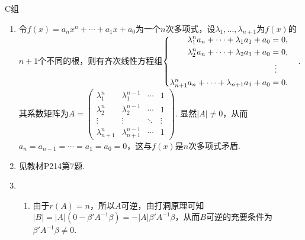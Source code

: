 \centerline{\heiti C组}
\begin{enumerate}
    \item 令$f(x)=a_nx^n+\cdots+a_1x+a_0$为一个$n$次多项式，设$\lambda_1,\ldots,\lambda_{n+1}$为$f(x)$的$n+1$个不同的根，则有齐次线性方程组$\begin{cases} \begin{aligned}
                      \lambda_1^n a_n+\cdots+\lambda_1a_1+a_0         & =0,               \\
                      \lambda_2^n a_n+\cdots+\lambda_2a_1+a_0         & =0,               \\
                                                                      & \vdotswithin{ = } \\
                      \lambda_{n+1}^n a_n+\cdots+\lambda_{n+1}a_1+a_0 & =0.
                  \end{aligned} \end{cases}$. 其系数矩阵为$A=\begin{pmatrix}
                  \lambda_1^n     & \lambda_1^{n-1}     & \cdots & 1      \\
                  \lambda_2^n     & \lambda_2^{n-1}     & \cdots & 1      \\
                  \vdots          & \vdots              & \ddots & \vdots \\
                  \lambda_{n+1}^n & \lambda_{n+1}^{n-1} & \cdots & 1
              \end{pmatrix}$. 显然$|A|\neq 0$，从而$a_n=a_{n-1}=\cdots=a_1=a_0=0$，这与$f(x)$是$n$次多项式矛盾.

    \item 见教材P214第7题.

    \item \begin{enumerate}
              \item 由于$r(A)=n$，所以$A$可逆，由打洞原理可知$|B|=|A|(0-\beta' A^{-1}\beta)=-|A|\beta' A^{-1}\beta$，从而$B$可逆的充要条件为$\beta' A^{-1}\beta\neq 0$.


\end{enumerate}
\end{enumerate}
